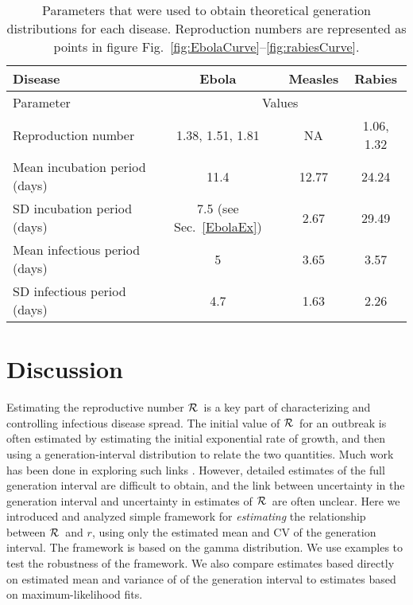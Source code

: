 \documentclass[12pt]{article}
\newcommand{\RR}{\ensuremath{{\cal R}}}
\newcommand{\sref}[1]{Sec.~\ref{#1}}
\newcommand{\frange}[2]{Fig.~\ref{fig:#1}--\ref{fig:#2}}
\newcommand{\tlab}[1]{\label{tab:#1}}
\begin{document}
\begin{table}[h!]
\centering
\begin{tabular}{l*{3}{c}}
\hline
Disease & Ebola & Measles & Rabies\\
\hline
Parameter & \multicolumn{3}{c}{Values}\\
\hline
Reproduction number & 1.38, 1.51, 1.81 \cite{AylwBarb14} & NA & 1.06, 1.32 \cite{HampDush09} \\
Mean incubation period (days) & 11.4 \cite{AylwBarb14} & 12.77 \cite{LessReic09}  & 24.24 \cite{HampDush09} \\
SD incubation period (days) & 7.5 (see \sref{EbolaEx}) & 2.67 \cite{LessReic09} & 29.49 \cite{HampDush09} \\
Mean infectious period (days) & 5 \cite{AylwBarb14} & 3.65 \cite{Lloy01} & 3.57 \cite{HampDush09} \\
SD infectious period (days) & 4.7 \cite{AylwBarb14} & 1.63 \cite{Lloy01} & 2.26 \cite{HampDush09}
\end{tabular}
\caption{Parameters that were used to obtain theoretical generation distributions for each disease. Reproduction numbers are represented as points in figure \frange{EbolaCurve}{rabiesCurve}.}
\tlab{parameters}
\end{table}

\section{Discussion}

Estimating the reproductive number \RR\ is a key part of characterizing and controlling infectious disease spread. The initial value of \RR\ for an outbreak is often estimated by estimating the initial exponential rate of growth, and then using a generation-interval distribution to relate the two quantities. 
Much work has been done in exploring such links \cite{WallLips07,Sven07,Nish10,Sven15}.
However, detailed estimates of the full generation interval are difficult to obtain, and the link between uncertainty in the generation interval and uncertainty in estimates of \RR\ are often unclear.
Here we introduced and analyzed simple framework for \emph{estimating} the relationship between \RR\ and $r$, using only the estimated mean and CV of the generation interval. The framework is based on the gamma distribution. We use examples to test the robustness of the framework. We also compare estimates based directly on estimated mean and variance of of the generation interval to estimates based on maximum-likelihood fits.
\end{document}
